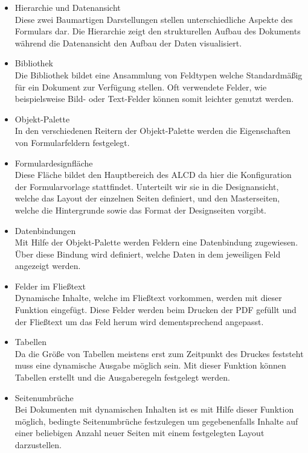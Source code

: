 \begin{itemize}
	\item Hierarchie und Datenansicht \\
		Diese zwei Baumartigen Darstellungen stellen unterschiedliche Aspekte des Formulars dar. Die Hierarchie zeigt den strukturellen Aufbau des Dokuments während die Datenansicht den Aufbau der Daten visualisiert.
	\item Bibliothek \\
		Die Bibliothek bildet eine Ansammlung von Feldtypen welche Standardmäßig für ein Dokument zur Verfügung stellen. Oft verwendete Felder, wie beispielsweise Bild- oder Text-Felder können somit leichter genutzt werden.
	\item Objekt-Palette \\
		In den verschiedenen Reitern der Objekt-Palette werden die Eigenschaften von Formularfeldern festgelegt.
	\item Formulardesignfläche \\
		Diese Fläche bildet den Hauptbereich des \ac{ALCD} da hier die Konfiguration der Formularvorlage stattfindet. Unterteilt wir sie in die Designansicht, welche das Layout der einzelnen Seiten definiert, und den Masterseiten, welche die Hintergrunde sowie das Format der Designseiten vorgibt.
	\item Datenbindungen \\
		Mit Hilfe der Objekt-Palette werden Feldern eine Datenbindung zugewiesen. Über diese Bindung wird definiert, welche Daten in dem jeweiligen Feld angezeigt werden.
	\item Felder im Fließtext \\
		Dynamische Inhalte, welche im Fließtext vorkommen, werden mit dieser Funktion eingefügt. Diese Felder werden beim Drucken der PDF gefüllt und der Fließtext um das Feld herum wird dementsprechend angepasst.
	\item Tabellen \\
		Da die Größe von Tabellen meistens erst zum Zeitpunkt des Druckes feststeht muss eine dynamische Ausgabe möglich sein. Mit dieser Funktion können Tabellen erstellt und die Ausgaberegeln festgelegt werden.
	\item Seitenumbrüche \\
		Bei Dokumenten mit dynamischen Inhalten ist es mit Hilfe dieser Funktion möglich, bedingte Seitenumbrüche festzulegen um gegebenenfalls Inhalte auf einer beliebigen Anzahl neuer Seiten mit einem festgelegten Layout darzustellen.
\end{itemize} 
       

